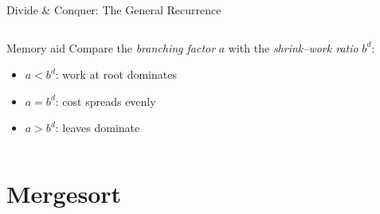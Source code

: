 \documentclass[aspectratio=169]{beamer}
\begin{document}
\begin{frame}[shrink=18]{Divide \& Conquer: The General Recurrence}
\begin{columns}[T]
      \vspace{0.4em}
      \begin{exampleblock}{Memory aid}
        Compare the \emph{branching factor} $a$ with the \emph{shrink–work ratio} $b^d$:
        \begin{itemize}
          \item $a < b^d$: work at root dominates
          \item $a = b^d$: cost spreads evenly
          \item $a > b^d$: leaves dominate
        \end{itemize}
      \end{exampleblock}
  \end{columns}
\end{frame}

\section{Mergesort}
\end{document}
